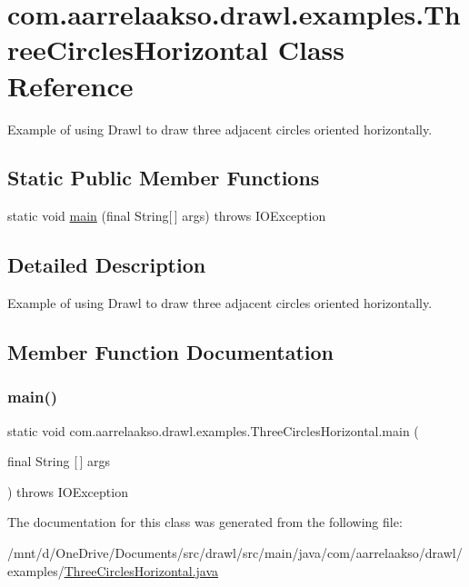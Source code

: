 \hypertarget{classcom_1_1aarrelaakso_1_1drawl_1_1examples_1_1_three_circles_horizontal}{}\section{com.\+aarrelaakso.\+drawl.\+examples.\+Three\+Circles\+Horizontal Class Reference}
\label{classcom_1_1aarrelaakso_1_1drawl_1_1examples_1_1_three_circles_horizontal}


Example of using Drawl to draw three adjacent circles oriented horizontally.  


\subsection*{Static Public Member Functions}
\begin{DoxyCompactItemize}
\item 
static void \hyperlink{classcom_1_1aarrelaakso_1_1drawl_1_1examples_1_1_three_circles_horizontal_a8b70432305be1987703beae7a8776a68}{main} (final String\mbox{[}$\,$\mbox{]} args)  throws I\+O\+Exception 
\end{DoxyCompactItemize}


\subsection{Detailed Description}
Example of using Drawl to draw three adjacent circles oriented horizontally. 

\subsection{Member Function Documentation}
\mbox{\label{classcom_1_1aarrelaakso_1_1drawl_1_1examples_1_1_three_circles_horizontal_a8b70432305be1987703beae7a8776a68}} 
\subsubsection{\texorpdfstring{main()}{main()}}
{\footnotesize\ttfamily static void com.\+aarrelaakso.\+drawl.\+examples.\+Three\+Circles\+Horizontal.\+main (\begin{DoxyParamCaption}\item[{final String \mbox{[}$\,$\mbox{]}}]{args }\end{DoxyParamCaption}) throws I\+O\+Exception\hspace{0.3cm}{\ttfamily [static]}}



The documentation for this class was generated from the following file\+:\begin{DoxyCompactItemize}
\item 
/mnt/d/\+One\+Drive/\+Documents/src/drawl/src/main/java/com/aarrelaakso/drawl/examples/\hyperlink{_three_circles_horizontal_8java}{Three\+Circles\+Horizontal.\+java}\end{DoxyCompactItemize}
